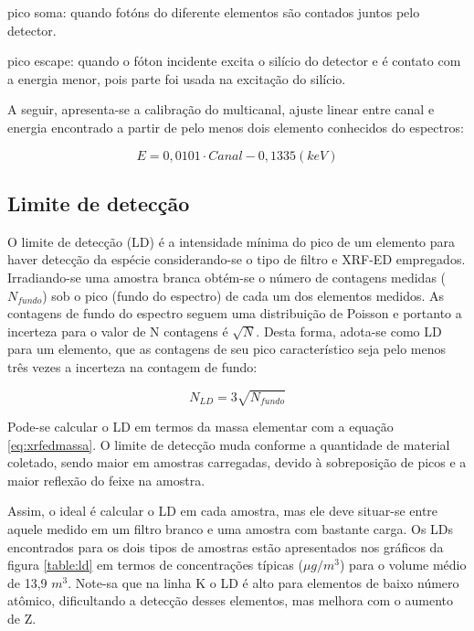 \begin{itemize}
  \begin{spacing}{1.0}
  \item pico soma: quando fotóns do diferente elementos são contados
        juntos pelo detector. 
  \item pico escape: quando o fóton incidente excita o silício do detector
        e é contato com a energia menor, pois parte foi usada na excitação 
        do silício. 
  \end{spacing}
\end{itemize}

A seguir, apresenta-se a calibração do multicanal, ajuste linear entre canal 
e energia encontrado a partir de pelo menos dois elemento conhecidos do 
espectros:

\begin{equation}
  E = 0,0101 \cdot Canal - 0,1335 (keV)
\end{equation}

\subsection{Limite de detecção}

O limite de detecção (LD) é a intensidade mínima do pico de um elemento para haver 
detecção da espécie considerando-se o tipo de filtro e XRF-ED empregados. 
Irradiando-se uma amostra branca obtém-se o número de contagens 
medidas ($N_{fundo}$) sob o pico (fundo do espectro) de cada um dos elementos
medidos.
As contagens de fundo do espectro seguem uma distribuição de Poisson e portanto 
a incerteza para o valor de N contagens é $\sqrt{N}$.
Desta forma, adota-se como LD para um elemento, que as contagens de seu pico 
característico seja pelo menos três vezes a incerteza na contagem de fundo:

\begin{equation}
  \label{eq:limitedeteccao}
  N_{LD} = 3 \sqrt{N_{fundo}}
\end{equation}

Pode-se calcular o LD em termos da massa elementar com a 
equação \ref{eq:xrfedmassa}. O limite de detecção muda conforme a quantidade de 
material coletado, sendo maior em amostras carregadas, devido à sobreposição de 
picos e a maior reflexão do feixe na amostra.

Assim, o ideal é calcular o LD em cada amostra, mas ele deve situar-se entre 
aquele medido em um filtro branco e uma amostra com bastante carga.
Os LDs encontrados para os dois tipos de amostras estão apresentados 
nos gráficos da figura \ref{table:ld} em termos de concentrações típicas 
($\mu g / m^3$) para o volume médio de 13,9 $m^3$. 
Note-sa que na linha K o LD é alto para elementos de baixo número atômico, 
dificultando a detecção desses elementos, mas melhora com o aumento de Z. 


